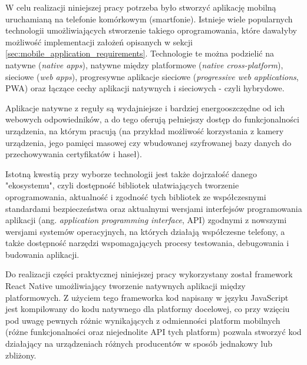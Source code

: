 \documentclass[../main.tex]{subfiles}
\begin{document}
W celu realizacji niniejszej pracy potrzeba było stworzyć aplikację mobilną uruchamianą na telefonie komórkowym (smartfonie). Istnieje wiele popularnych technologii umożliwiających stworzenie takiego oprogramowania, które dawałyby możliwość implementacji założeń opisanych w sekcji \ref{sec:mobile_application_requirements}. Technologie te można podzielić na natywne (\textit{native apps}), natywne między platformowe (\textit{native cross-platform}), sieciowe (\textit{web apps}), progresywne aplikacje sieciowe (\textit{progressive web applications}, PWA) oraz łączące cechy aplikacji natywnych i sieciowych - czyli hybrydowe\cite{mobile_applications_typology}\cite{mobile_applications_typology_2}.

Aplikacje natywne z reguły są wydajniejsze i bardziej energooszczędne od ich webowych odpowiedników\cite{android_vs_web_energy_efficiency_comparison}, a do tego oferują pełniejszy dostęp do funkcjonalności urządzenia, na którym pracują (na przykład możliwość korzystania z kamery urządzenia, jego pamięci masowej czy wbudowanej szyfrowanej bazy danych do przechowywania certyfikatów i haseł).

Istotną kwestią przy wyborze technologii jest także dojrzałość danego "ekosystemu", czyli dostępność bibliotek ułatwiających tworzenie oprogramowania, aktualność i zgodność tych bibliotek ze współczesnymi standardami bezpieczeństwa oraz aktualnymi wersjami interfejsów programowania aplikacji (ang. \textit{application programming interface}, API) zgodnymi z nowszymi wersjami systemów operacyjnych, na których działają współczesne telefony, a także dostępność narzędzi wspomagających procesy testowania, debugowania i budowania aplikacji.

Do realizacji części praktycznej niniejszej pracy wykorzystany został framework React Native umożliwiający tworzenie natywnych aplikacji między platformowych. Z użyciem tego frameworka kod napisany w języku JavaScript jest kompilowany do kodu natywnego dla platformy docelowej\cite{react_native}, co przy wzięciu pod uwagę pewnych różnic wynikających z odmienności platform mobilnych (różne funkcjonalności oraz niejednolite API tych platform) pozwala stworzyć kod działający na urządzeniach różnych producentów w sposób jednakowy lub zbliżony.
\end{document}
